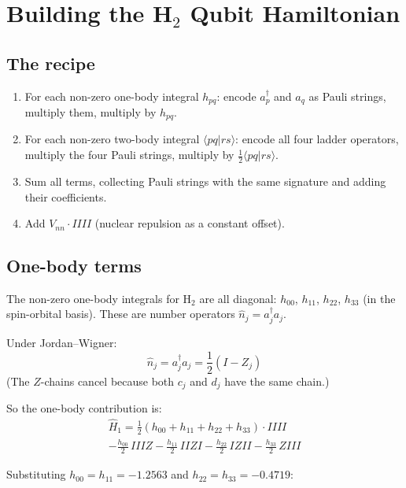 \documentclass[aps,prb,preprint,longbibliography,nofootinbib]{revtex4-2}
\begin{document}
\section{Building the H$_2$ Qubit Hamiltonian}
\label{sec:building}

\subsection{The recipe}

\begin{enumerate}
\item For each non-zero one-body integral $h_{pq}$: encode
  $a^\dagger_p$ and $a_q$ as Pauli strings, multiply them, multiply by
  $h_{pq}$.
\item For each non-zero two-body integral $\langle pq|rs\rangle$:
  encode all four ladder operators, multiply the four Pauli strings,
  multiply by $\frac{1}{2}\langle pq|rs\rangle$.
\item Sum all terms, collecting Pauli strings with the same signature
  and adding their coefficients.
\item Add $V_{nn} \cdot IIII$ (nuclear repulsion as a constant offset).
\end{enumerate}

\subsection{One-body terms}

The non-zero one-body integrals for H$_2$ are all diagonal:
$h_{00}$, $h_{11}$, $h_{22}$, $h_{33}$ (in the spin-orbital basis).
These are number operators $\hat{n}_j = a^\dagger_j a_j$.

Under Jordan--Wigner:
\begin{equation}
\hat{n}_j = a^\dagger_j a_j = \frac{1}{2}(I - Z_j)
\end{equation}
(The $Z$-chains cancel because both $c_j$ and $d_j$ have the same
chain.)

So the one-body contribution is:
\begin{multline}
\hat{H}_1 = \frac{1}{2}(h_{00} + h_{11} + h_{22} + h_{33})\cdot IIII \\
  - \frac{h_{00}}{2}\, IIIZ - \frac{h_{11}}{2}\, IIZI
  - \frac{h_{22}}{2}\, IZII - \frac{h_{33}}{2}\, ZIII
\end{multline}

Substituting $h_{00} = h_{11} = -1.2563$ and
$h_{22} = h_{33} = -0.4719$:
\end{document}
